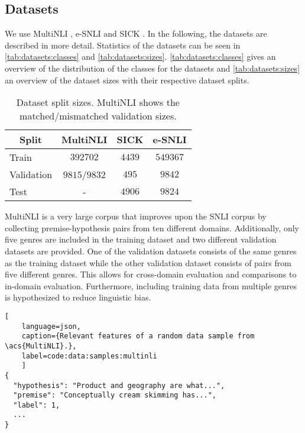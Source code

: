 \subsection{Datasets} \label{par:models_datasets:datasets}
We use \acs{MultiNLI} \cite{multinli}, \acs{e-SNLI} \cite{esnli} and \acs{SICK} \cite{sick}. In the following, the datasets are described in more detail. Statistics of the datasets can be seen in \autoref{tab:datasets:classes} and \autoref{tab:datasets:sizes}. \autoref{tab:datasets:classes} gives an overview of the distribution of the classes for the datasets and \autoref{tab:datasets:sizes} an overview of the dataset sizes with their respective dataset splits.


\begin{table}[h]
    \centering
    \caption{Dataset split sizes. \acs{MultiNLI} shows the matched/mismatched validation sizes.}
    \begin{tabular}{l  c c c}
        \toprule
        \multicolumn{1}{c}{Split} & \acs{MultiNLI} & \acs{SICK} & \acs{e-SNLI} \\
        \midrule
        Train & $392702$ & $4439$ & $549367$ \\
        Validation & $9815$/$9832$ & $495$ & $9842$ \\
        Test & - & $4906$ & $9824$ \\
        \bottomrule
    \end{tabular}
    \label{tab:datasets:sizes}
\end{table}

\Acf{MultiNLI} \cite{multinli} is a very large corpus that improves upon the \acs{SNLI} corpus by collecting premise-hypothesis pairs from ten different domains. Additionally, only five genres are included in the training dataset and two different validation datasets are provided. One of the validation datasets consists of the same genres as the training dataset while the other validation dataset consists of pairs from five different genres. This allows for cross-domain evaluation and comparisons to in-domain evaluation. Furthermore, including training data from multiple genres is hypothesized to reduce linguistic bias.

\begin{lstlisting}[
    language=json,
    caption={Relevant features of a random data sample from \acs{MultiNLI}.},
    label=code:data:samples:multinli
    ]
{
  "hypothesis": "Product and geography are what...",
  "premise": "Conceptually cream skimming has...",
  "label": 1,
  ...
}
\end{lstlisting}

